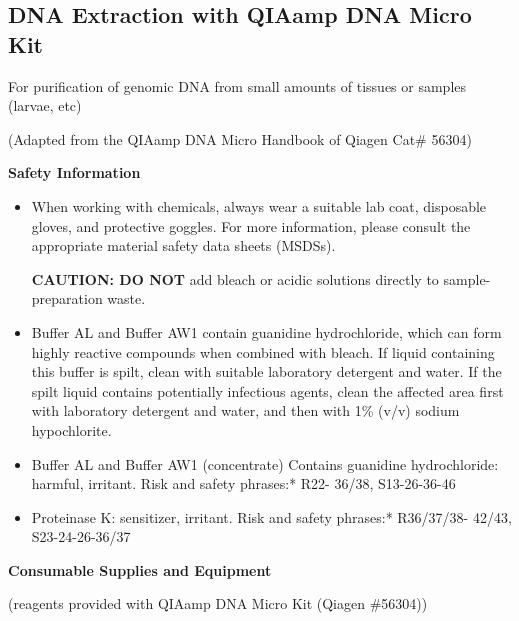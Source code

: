 \documentclass[11pt, oneside]{article}
\begin{document}
	
	\newpage



	\subsection{DNA Extraction with QIAamp DNA Micro Kit}

		\begin{center} 
			For purification of genomic DNA from small amounts of tissues or samples (larvae, etc)

			(Adapted from the QIAamp DNA Micro Handbook of Qiagen Cat\# 56304)
		\end{center}

		{\bf Safety Information}

		\begin{itemize}[leftmargin=.5in]
		\itemsep0mm
 			\item When working with chemicals, always wear a suitable lab coat, disposable gloves, and protective goggles. For more information, 				please consult the appropriate material safety data sheets (MSDSs).

			\vspace{3mm}
			{\bf CAUTION: DO NOT} add bleach or acidic solutions directly to sample-preparation waste.
			\vspace{3mm}

			\item Buffer AL and Buffer AW1 contain guanidine hydrochloride, which can form highly reactive compounds when combined with bleach. If 			liquid containing this buffer is spilt, clean with suitable laboratory detergent and water. If the spilt liquid contains potentially infectious agents, 			clean the affected area first with laboratory detergent and water, and then with 1\% (v/v) sodium hypochlorite.
			\item Buffer AL and Buffer AW1 (concentrate) Contains guanidine hydrochloride: harmful, irritant. Risk and safety phrases:* R22- 36/38, 				S13-26-36-46
			\item Proteinase K: sensitizer, irritant. Risk and safety phrases:* R36/37/38-
			42/43, S23-24-26-36/37
		\end{itemize}

		{\bf Consumable Supplies and Equipment}

		(reagents provided with QIAamp DNA Micro Kit (Qiagen \#56304))
\end{document}
